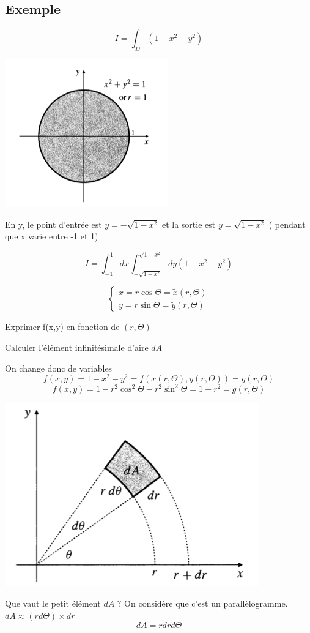 \subsection{Exemple}
\[I=\int_D (1-x^2-y^2)\]
\begin{center}
\includegraphics[scale=0.7]{image5.png}
\end{center}

 En y, le point d'entrée est $y=-\sqrt{1-x^2}$ et la sortie est  $y=\sqrt{1-x^2}$ ( pendant que x varie entre -1 et 1)

 \[I=\int_{-1}^1 dx \int_{-\sqrt{1-x^2}}^{\sqrt{1-x^2}} dy(1-x^2-y^2) \]

 \begin{myrem}
 $$\left\{
 \begin{array}{r}
 x=r\cos\Theta = \tilde{x}(r,\Theta)\\
 y=r \sin \Theta = \tilde{y}(r,\Theta)
 \end{array}
 \right.
 $$

 Exprimer f(x,y) en fonction de $(r,\Theta)$
 
 Calculer l'élément infinitésimale d'aire $dA$
 \end{myrem}

 On change donc de variables
 \[f(x,y)=1-x^2-y^2=f(x(r,\Theta),y(r,\Theta)) = g(r,\Theta)\]
 \[f(x,y) = 1-r^2\cos^2\Theta -r^2\sin^2\Theta = 1-r^2 = g(r,\Theta)\]
 \begin{center}

 \includegraphics[scale=0.7]{image6.png}\\

 \end{center}
 Que vaut le petit élément $dA$ ? On considère que c'est un parallèlogramme.
 $dA\approx (rd\Theta)\times dr$
 \[dA = r dr d\Theta\]

